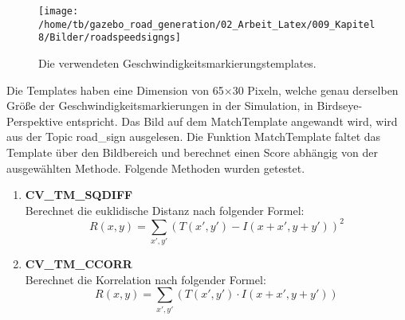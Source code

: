 \begin{figure}[H]
\begin{center}
  \texttt{[image: /home/tb/gazebo\_road\_generation/02\_Arbeit\_Latex/009\_Kapitel8/Bilder/roadspeedsigngs]}%
  \caption[Die verwendeten Geschwindigkeitsmarkierungstemplates]%
           {\label{fig:Geschwindigkeitsmarkierungstemplates}%
           Die verwendeten Geschwindigkeitsmarkierungstemplates.
           }
\end{center}
\end{figure}

Die Templates haben eine Dimension von 65$\times$30 Pixeln, welche genau derselben Gr{\"o}{\ss}e der Geschwindigkeitsmarkierungen in der Simulation, in Birdseye-Perspektive entspricht. Das Bild auf dem MatchTemplate angewandt wird, wird aus der Topic road\_sign ausgelesen.
Die Funktion MatchTemplate faltet das Template {\"u}ber den Bildbereich und berechnet einen Score abh{\"a}ngig von der ausgew{\"a}hlten Methode. Folgende Methoden wurden getestet.

\begin{enumerate}

\item[] \textbf{CV\_TM\_SQDIFF}\hfill \\
Berechnet die euklidische Distanz nach folgender Formel:
$$R(x,y) = \sum_{x',y'} (T(x',y')-I(x+x',y+y'))^2$$ 

 


\item[] \textbf{CV\_TM\_CCORR}\hfill \\
Berechnet die Korrelation nach folgender Formel:
$$R(x,y) = \sum_{x',y'} (T(x',y') \cdot I(x+x',y+y'))$$ 
 

\end{enumerate}







